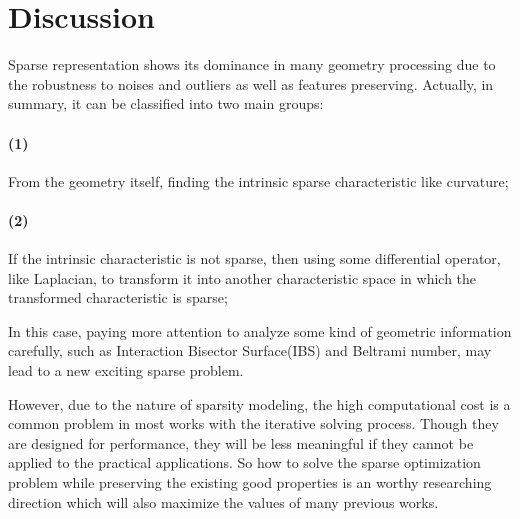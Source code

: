 \section{Discussion}
\label{sec:Discussion}

Sparse representation shows its dominance in many geometry processing due to the robustness to noises and outliers as well as features preserving.
Actually, in summary, it can be classified into two main groups:

\paragraph{(1)}
From the geometry itself, finding the intrinsic sparse characteristic like curvature;
\paragraph{(2)}
If the intrinsic characteristic is not sparse, then using some differential operator, like Laplacian, to transform it into another characteristic space in which the transformed characteristic is sparse;

In this case, paying more attention to analyze some kind of geometric information carefully, such as Interaction Bisector Surface(IBS) and Beltrami number, may lead to a new exciting sparse problem.


However, due to the nature of sparsity modeling, the high computational cost is a common problem in most works with the iterative solving process.
Though they are designed for performance, they will be less meaningful if they cannot be applied to the practical applications.
So how to solve the sparse optimization problem while preserving the existing good properties is an worthy researching direction which will also maximize the values of many previous works.
